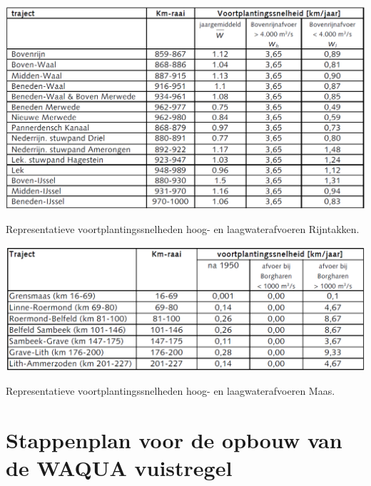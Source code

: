 \begin{table}
\includegraphics[width=\columnwidth]{figures/Tab4_the2nd.png}
\caption{Representatieve voortplantingssnelheden hoog- en laagwaterafvoeren Rijntakken.}
\label{Tab4RT}
\end{table}

\begin{table}
\includegraphics[width=\columnwidth]{figures/Tab5.png}
\caption{Representatieve voortplantingssnelheden hoog- en laagwaterafvoeren Maas.}
\label{Tab5}
\end{table}

\section{Stappenplan voor de opbouw van de WAQUA vuistregel}

